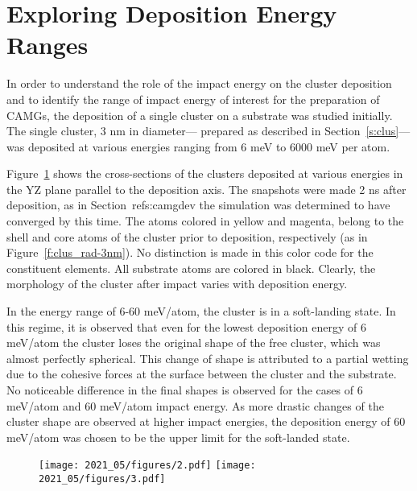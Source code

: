 \section{Exploring Deposition Energy Ranges} 
\begin{selfcite}
In order to understand the role of the impact energy on the cluster deposition and to identify the range of impact energy of interest for the preparation of CAMGs, the deposition of a single cluster on a substrate was studied initially. The single \cz  cluster, 3 nm in diameter— prepared as described in Section~\ref{s:clus}—was deposited at various energies ranging from 6 meV to 6000 meV per atom. \par

Figure~\ref{f:clus_single3} shows the cross-sections of the clusters deposited at various energies in the YZ plane parallel to the deposition axis. The snapshots were made 2 ns after deposition, as in Section~ref{s:camgdev} the simulation was determined to have converged by this time. The atoms colored in yellow and magenta, belong to the shell and core atoms of the cluster prior to deposition, respectively (as in Figure~\ref{f:clus_rad-3nm}). No distinction is made in this color code for the constituent elements. All substrate atoms are colored in black. Clearly, the morphology of the cluster after impact varies with deposition energy. \par In the energy range of 6-60 meV/atom, the cluster is in a soft-landing state. In this regime, it is observed that even for the lowest deposition energy of 6 meV/atom the cluster loses the original shape of the free cluster, which was almost perfectly spherical. This change of shape is attributed to a partial wetting due to the cohesive forces at the surface between the cluster and the substrate. No noticeable difference in the final shapes is observed for the cases of 6 meV/atom and 60 meV/atom impact energy. As more drastic changes of the cluster shape are observed at higher impact energies, the deposition energy of 60 meV/atom was chosen to be the upper limit for the soft-landed state.

\begin{figure}
	\centering
	\texttt{[image: 2021\_05/figures/2.pdf]}
	\texttt{[image: 2021\_05/figures/3.pdf]}
	\label{f:clus_single3}
\end{figure}


\end{selfcite}
